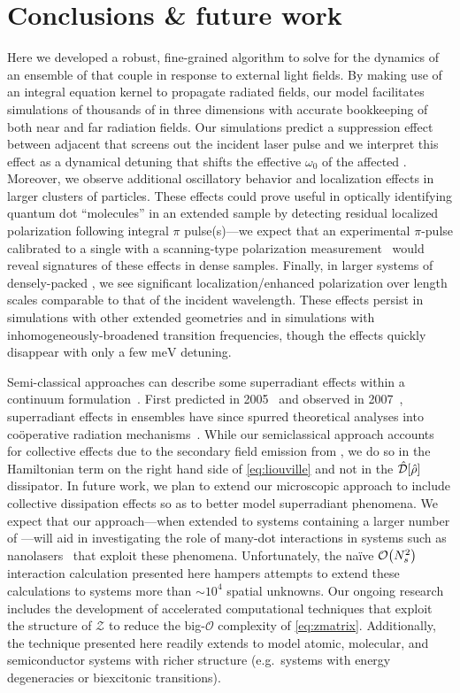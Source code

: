 \section{\label{section:conclusion}Conclusions \& future work}
Here we developed a robust, fine-grained algorithm to solve for the dynamics of an ensemble of \qds{} that couple in response to external light fields.
By making use of an integral equation kernel to propagate radiated fields, our model facilitates simulations of thousands of \qds{} in three dimensions with accurate bookkeeping of both near and far radiation fields.
Our simulations predict a suppression effect between adjacent \qds{} that screens out the incident laser pulse and we interpret this effect as a dynamical detuning that shifts the effective $\omega_0$ of the affected \qds{}.
Moreover, we observe additional oscillatory behavior and localization effects in larger clusters of particles.
These effects could prove useful in optically identifying quantum dot ``molecules'' in an extended sample by detecting residual localized polarization following integral $\pi$ pulse(s)---we expect that an experimental $\pi$-pulse calibrated to a single \qd{} with a scanning-type polarization measurement~\cite{Asakura2013} would reveal signatures of these effects in dense samples.
Finally, in larger systems of densely-packed \qds{}, we see significant localization/enhanced polarization over length scales comparable to that of the incident wavelength.
These effects persist in simulations with other extended geometries and in simulations with inhomogeneously-broadened transition frequencies, though the effects quickly disappear with only a few $\si{\milli\eV}$ detuning.

Semi-classical approaches can describe some superradiant effects within a continuum formulation~\cite{Gross1982,PhysRevA.4.302,PhysRevA.4.854}.
First predicted in 2005~\cite{Temnov2005} and observed in 2007~\cite{Scheibner2007}, superradiant effects in \qd{} ensembles have since spurred theoretical analyses into co\"operative radiation mechanisms~\cite{Temnov2009,Chen2008}.
While our semiclassical approach accounts for collective effects due to the secondary field emission from \qds{}, we do so in the Hamiltonian term on the right hand side of \cref{eq:liouville} and not in the $\hat{\mathcal{D}}\qty[\hat{\rho}]$ dissipator.
In future work, we plan to extend our microscopic approach to include collective dissipation effects so as to better model superradiant phenomena.
We expect that our approach---when extended to systems containing a larger number of \qds{}---will aid in investigating the role of many-dot interactions in systems such as nanolasers~\cite{jahnke2016giant} that exploit these phenomena.
Unfortunately, the na\"ive $\mathcal{O}\qty(N_s^2)$ interaction calculation presented here hampers attempts to extend these calculations to systems more than $\sim 10^4$ spatial unknowns.
Our ongoing research includes the development of accelerated computational techniques that exploit the structure of $\mathcal{Z}$ to reduce the big-$\mathcal{O}$ complexity of \cref{eq:zmatrix}.
Additionally, the technique presented here readily extends to model atomic, molecular, and semiconductor systems with richer structure (e.g.\ systems with energy degeneracies or biexcitonic transitions).

